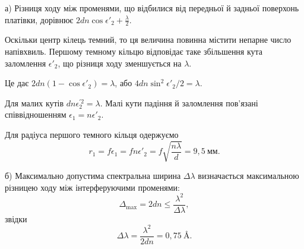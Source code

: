 
\begin{solutionexample}

	а) Різниця ходу між променями, що відбилися від передньої й задньої
	поверхонь платівки, дорівнює $2dn\cos\epsilon'_2 + \frac\lambda2$.

	Оскільки центр кілець темний, то ця величина повинна містити непарне число напівхвиль.
	Першому темному кільцю відповідає таке збільшення кута заломлення $\epsilon'_2$,
	що різниця ходу зменшується на $\lambda$.

	Це дає $2dn(1-\cos\epsilon'_2) = \lambda$, або $4dn\sin^2\epsilon'_2/2 = \lambda$.

	Для малих кутів $dn\epsilon^{\prime2}_2 = \lambda$. Малі кути падіння й
	заломлення пов'язані співвідношенням  $\epsilon_1 = n\epsilon'_2$.

	Для радіуса першого темного кільця одержуємо
	\begin{equation*}
		r_1 = f\epsilon_1 = fn\epsilon'_2 = f\sqrt{\frac{n\lambda}{d}} = 9,5\ \text{мм}.
	\end{equation*}

	б) Максимально допустима спектральна ширина $\Delta\lambda$ визначається максимальною різницею ходу між інтерферуючими променями:
	\begin{equation*}
		\Delta_{\max} = 2dn \le \frac{\lambda^2}{\Delta\lambda},
	\end{equation*}
	звідки
	\begin{equation*}
		\Delta\lambda = \frac{\lambda^2}{2dn} = 0,75\ \text{\AA}.
	\end{equation*}

\end{solutionexample}


